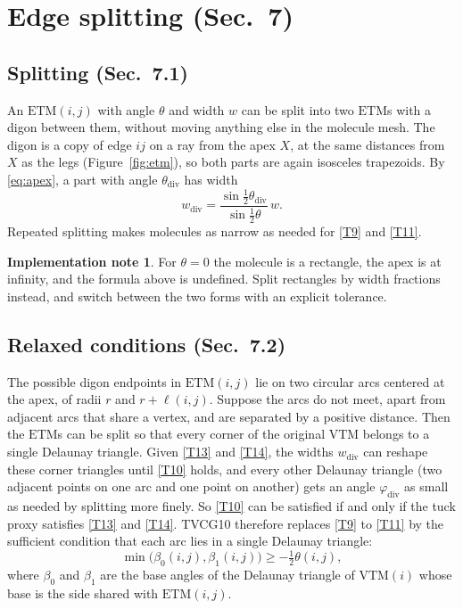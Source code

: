 \documentclass[11pt]{article}
\theoremstyle{definition}
\newtheorem{impl}{Implementation note}
\newcommand{\ETM}{\mathrm{ETM}}
\newcommand{\VTM}{\mathrm{VTM}}
\begin{document}
\section{Edge splitting (Sec.~7)}\label{sec:split}

\subsection{Splitting (Sec.~7.1)}

An $\ETM(i,j)$ with angle $\theta$ and width $w$ can be split into two
$\ETM$s with a digon between them, without moving anything else in the molecule
mesh. The digon is a copy of edge $ij$ on a ray from the apex $X$, at the same
distances from $X$ as the legs (Figure~\ref{fig:etm}), so both parts are again
isosceles trapezoids. By \eqref{eq:apex}, a part with angle $\theta_{\mathrm{div}}$
has width
\begin{equation*}
  w_{\mathrm{div}} = \frac{\sin\frac12\theta_{\mathrm{div}}}{\sin\frac12\theta}\, w .
  \tag*{(Sec.~7.1)}
\end{equation*}
Repeated splitting makes molecules as narrow as needed for \eqref{T9} and
\eqref{T11}.

\begin{impl}
For $\theta = 0$ the molecule is a rectangle, the apex is at infinity, and the
formula above is undefined. Split rectangles by width fractions instead, and
switch between the two forms with an explicit tolerance.
\end{impl}

\subsection{Relaxed conditions (Sec.~7.2)}

The possible digon endpoints in $\ETM(i,j)$ lie on two circular arcs centered at
the apex, of radii $r$ and $r + \ell(i,j)$. Suppose the arcs do not meet, apart
from adjacent arcs that share a vertex, and are separated by a positive
distance. Then the $\ETM$s can be split so that every corner of the original
$\VTM$ belongs to a single Delaunay triangle. Given \eqref{T13} and \eqref{T14},
the widths $w_{\mathrm{div}}$ can reshape these corner triangles until
\eqref{T10} holds, and every other Delaunay triangle (two adjacent points on one
arc and one point on another) gets an angle $\varphi_{\mathrm{div}}$ as small as
needed by splitting more finely. So \eqref{T10} can be satisfied if and only if
the tuck proxy satisfies \eqref{T13} and \eqref{T14}. TVCG10 therefore replaces
\eqref{T9} to \eqref{T11} by the sufficient condition that each arc lies in a
single Delaunay triangle:
\begin{equation}
  \min\bigl(\beta_0(i,j), \beta_1(i,j)\bigr) \ge -\tfrac12\theta(i,j),
  \tag{T19}\label{T19}
\end{equation}
where $\beta_0$ and $\beta_1$ are the base angles of the Delaunay triangle of
$\VTM(i)$ whose base is the side shared with $\ETM(i,j)$.
\end{document}
